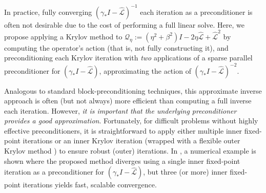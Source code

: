 \documentclass[review]{siamart}
\begin{document}
\begin{remark}\label{sec:inexact-precond}
In practice, fully converging $(\gamma_* I - \widehat{\mathcal{L}})^{-1}$
each iteration as a preconditioner is often not desirable due to the cost
of performing a full linear solve. Here, we propose
applying a Krylov method to $\mathcal{Q}_\eta:=(\eta^2+\beta^2)I - 2\eta\widehat{\mathcal{L}} +
\widehat{\mathcal{L}}^2$ by computing the operator's action (that is, not fully constructing
it), and preconditioning each Krylov iteration with \textit{two} applications of a sparse
parallel preconditioner for $(\gamma_* I - \widehat{\mathcal{L}})$, approximating the action
of $(\gamma_* I - \widehat{\mathcal{L}})^{-2}$.

Analogous to standard block-preconditioning techniques, this approximate inverse
approach is often (but not always) more efficient than computing a full inverse
each iteration. However, \textit{it is important that the underlying preconditioner
provides a good approximation}.
Fortunately, for difficult problems without highly effective
preconditioners, it is straightforward to apply either multiple inner fixed-point iterations
or an inner Krylov iteration (wrapped with a flexible outer Krylov method
\cite{Notay2000,saad1993flexible}) to ensure robust (outer) iterations.
In , a
numerical example is shown where the proposed method diverges using a single inner
fixed-point iteration as a preconditioner for $(\gamma_* I - \widehat{\mathcal{L}})$, but
three (or more) inner fixed-point iterations yields fast, scalable convergence. 
\end{remark}
\end{document}
